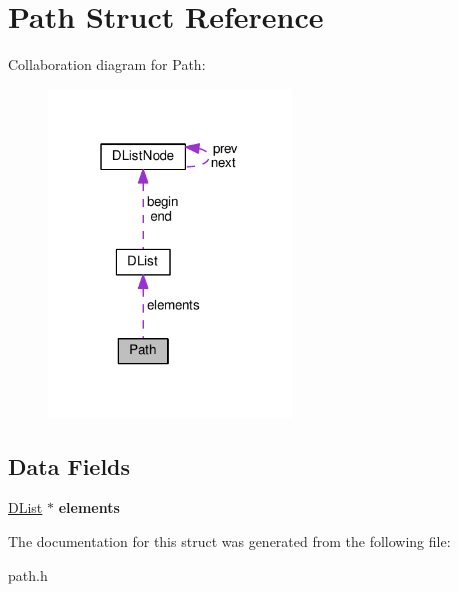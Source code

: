\hypertarget{struct_path}{}\section{Path Struct Reference}
\label{struct_path}


Collaboration diagram for Path\+:
\nopagebreak
\begin{figure}[H]
\begin{center}
\leavevmode
\includegraphics[width=183pt]{struct_path__coll__graph}
\end{center}
\end{figure}
\subsection*{Data Fields}
\begin{DoxyCompactItemize}
\item 
\hyperlink{struct_d_list}{D\+List} $\ast$ {\bfseries elements}\hypertarget{struct_path_ac44fbb525c96220fa2fa5727f2afd17e}{}\label{struct_path_ac44fbb525c96220fa2fa5727f2afd17e}

\end{DoxyCompactItemize}


The documentation for this struct was generated from the following file\+:\begin{DoxyCompactItemize}
\item 
path.\+h\end{DoxyCompactItemize}
